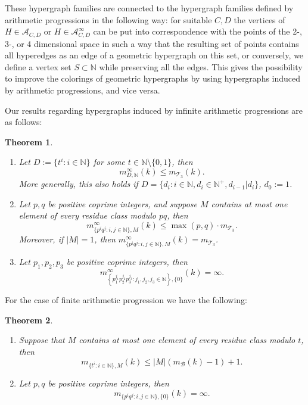 \documentclass[11pt,oneside]{amsart}
\newcommand{\N}{\mathbb{N}}
\newcommand{\A}{\mathcal{A}}
\newtheorem{theorem}{Theorem}
\begin{document}
These hypergraph families are connected to the hypergraph families defined by arithmetic progressions in the following way: for suitable $C,D$ the vertices of $H\in\A_{C,D}$ or $H\in\A_{C,D}^\infty$ can be put into correspondence with the points of the 2-, 3-, or 4 dimensional space in such a way that the resulting set of points contains all hyperedges as an edge of a geometric hypergraph on this set, or conversely, we define a vertex set $S\subset \mathbb{N}$ while preserving all the edges.
This gives the possibility to improve the colorings of geometric hypergraphs by using hypergraphs induced by arithmetic progressions, and vice versa.





Our results regarding hypergraphs induced by infinite arithmetic progressions are as follows:

\begin{theorem}\label{vegtelen_sorozat}

\begin{enumerate}
    \item 
    Let $D := \{t^i:i \in \mathbb{N}\}$ for some $t \in \mathbb{N} \setminus \{0,1\}$, then
    \[
    m_{D, \mathbb{N}}^{\infty}(k) \leq m_{\mathcal{T}_3}(k).
    \]
    More generally, this also holds if $D = \{d_i: i\in\N, d_i \in \mathbb{N}^+, d_{i-1} | d_{i}\}$, $d_0:=1$.
    \item 
    Let $p,q$ be positive coprime integers, and suppose $M$ contains at most one element of every residue class modulo $pq$, then
    \[
    m_{\{p^iq^j:i,j \in \mathbb{N}\}, M}^{\infty}(k) \leq \max(p,q)\cdot m_{\mathcal{T}_3}.
    \]
    Moreover, if $|M|=1$, then $m_{\{p^iq^j:i,j \in \mathbb{N}\}, M}^{\infty}(k) = m_{\mathcal{T}_3}$.
    \item 
    Let $p_1, p_2, p_3$ be positive coprime integers, then 
    \[
    m_{\left\{ p_1^{j_1}p_2^{j_2}p_3^{j_3}:j_1,j_2,j_3 \in \mathbb{N}\right\},\{0\}}^{\infty}(k) = \infty.
    \]

\end{enumerate}
\end{theorem}

For the case of finite arithmetic progression we have the following:

\begin{theorem}\label{veges_sorozat}
\begin{enumerate}
    \item 
    Suppose that $M$ contains at most one element of every residue class modulo $t$, then
    \[
    m_{\{t^i:i \in \mathbb{N}\}, M}(k) \leq |M|(m_{\mathcal{B}}(k) -1) + 1.
    \]
    \item 
    Let $p,q$ be positive coprime integers, then
    \[
    m_{\{p^iq^j:i,j \in \mathbb{N}\},\{0\}}(k) = \infty.
    \]
\textbf{\textbf{}}\end{enumerate}
\end{theorem}
\end{document}
